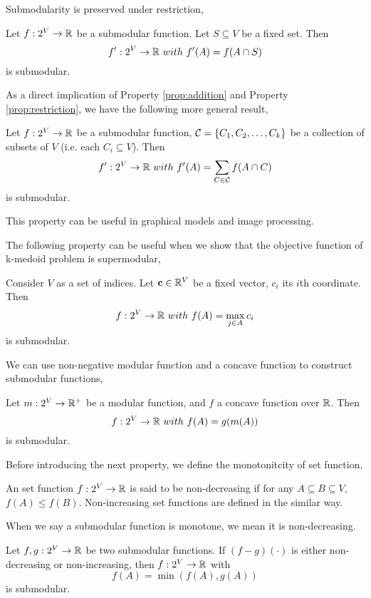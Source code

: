 Submodularity is preserved under restriction,
\begin{property}
  \label{prop:restriction}
  Let $f: 2^V \rightarrow \mathbb{R}$ be a submodular function. Let $S\subseteq V$ be a fixed set. Then
$$f':2^V \rightarrow \mathbb{R}~{with}~f'(A) = f(A\cap S)$$
is submodular.
\end{property}

As a direct implication of Property \ref{prop:addition} and Property \ref{prop:restriction}, we have the following more general result,
\begin{property}
Let $f:2^V \rightarrow \mathbb{R}$ be a submodular function, $\mathcal{C} = \{C_1, C_2, \ldots, C_k\}$ be a collection of subsets of $V$ (i.e. each $C_i \subseteq V$). Then
$$f':2^V \rightarrow \mathbb{R}~{with}~f'(A) = \sum_{C\in\mathcal{C}}f(A\cap C)$$ 
is submodular.
\end{property}
This property can be useful in graphical models and image processing. 


The following property can be useful when we show that the objective function of k-medoid problem is supermodular,
\begin{property}
  \label{prop:max}
Consider $V$ as a set of indices. Let $\mathbf{c}\in \mathbb{R}^V$ be a fixed vector, $c_i$ its $i$th coordinate. Then 
$$f:2^V \rightarrow \mathbb{R}~{with}~ f(A) = \max_{j\in A}c_i$$ 
is submodular.
\end{property}

We can use non-negative modular function and a concave function to construct submodular functions,
\begin{property}
  Let $m: 2^V \rightarrow \mathbb{R}^+$ be a modular function, and $f$ a concave function over $\mathbb{R}$. Then
$$f: 2^V \rightarrow \mathbb{R} ~{with}~ f(A) = g(m(A))$$
is submodular.
\end{property}

Before introducing the next property, we define the monotonitcity of set function,
\begin{definition}[Monotonitcity]
  An set function $f: 2^V \rightarrow  \mathbb{R}$ is said to be non-decreasing if for any $A\subseteq B \subseteq V$, $f(A) \leq f(B)$. Non-increasing set functions are defined in the similar way.
\end{definition}
When we say a submodular function is monotone, we mean it is non-decreasing.

\begin{property}
  Let $f, g: 2^V \rightarrow \mathbb{R}$ be two submodular functions. If $(f - g)(\cdot)$ is either non-decreasing or non-increasing, then $f: 2^V \rightarrow \mathbb{R}$ with
$$f(A) = \min(f(A), g(A))$$
is submodular.
\end{property}



